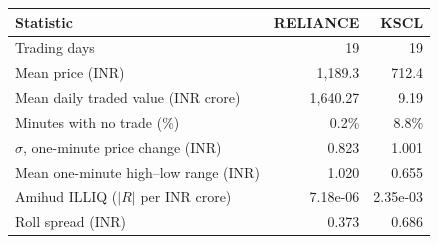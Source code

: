 \begin{tabular}{lrr}
\toprule
Statistic & RELIANCE & KSCL \\
\midrule
Trading days & 19 & 19 \\
Mean price (INR) & 1,189.3 & 712.4 \\
Mean daily traded value (INR crore) & 1,640.27 & 9.19 \\
Minutes with no trade (\%) & 0.2\% & 8.8\% \\
$\sigma$, one-minute price change (INR) & 0.823 & 1.001 \\
Mean one-minute high--low range (INR) & 1.020 & 0.655 \\
Amihud ILLIQ ($|R|$ per INR crore) & 7.18e-06 & 2.35e-03 \\
Roll spread (INR) & 0.373 & 0.686 \\
\bottomrule
\end{tabular}
